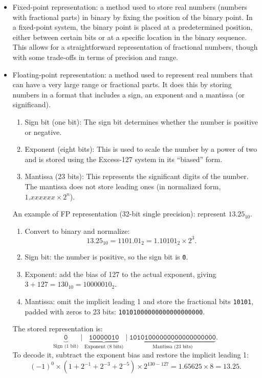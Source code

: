 \documentclass[a4paper,12pt]{article}
\begin{document}
\begin{itemize}
\item Fixed-point representation: a method used to store real numbers (numbers with fractional parts) in binary by fixing the position of the binary point. In a fixed-point system, the binary point is placed at a predetermined position, either between certain bits or at a specific location in the binary sequence. This allows for a straightforward representation of fractional numbers, though with some trade-offs in terms of precision and range.
\item Floating-point representation: a method used to represent real numbers that can have a very large range or fractional parts. It does this by storing numbers in a format that includes a sign, an exponent and a mantissa (or significand).
\begin{enumerate}
    \item Sign bit (one bit): The sign bit determines whether the number is positive or negative. 
    \item Exponent (eight bits): 
This is used to scale the number by a power of two and is stored using the Excess-127 system in its “biased” form.
\item Mantissa (23 bits): 
This represents the significant digits of the number. The mantissa does not store leading ones (in normalized form, $1.xxxxxx\times 2^n$). 
\end{enumerate}
An example of FP representation (32-bit single precision): represent $13.25_{10}$.
\begin{enumerate}
    \item Convert to binary and normalize:
    \[
    13.25_{10} = 1101.01_2 = 1.10101_2 \times 2^3.
    \]
    \item Sign bit: the number is positive, so the sign bit is \texttt{0}.
    \item Exponent: add the bias of 127 to the actual exponent, giving $3 + 127 = 130_{10} = 10000010_2$.
    \item Mantissa: omit the implicit leading 1 and store the fractional bits \texttt{10101}, padded with zeros to 23 bits: \texttt{10101000000000000000000}.
\end{enumerate}
The stored representation is:
\[
\underbrace{\texttt{0}}_{\text{Sign (1 bit)}}\;\vert\;
\underbrace{\texttt{10000010}}_{\text{Exponent (8 bits)}}\;\vert\;
\underbrace{\texttt{10101000000000000000000}}_{\text{Mantissa (23 bits)}}.
\]
To decode it, subtract the exponent bias and restore the implicit leading 1:
\[
(-1)^0 \times (1 + 2^{-1} + 2^{-3} + 2^{-5}) \times 2^{130-127}
= 1.65625 \times 8 = 13.25.
\]
\end{itemize}
\end{document}
